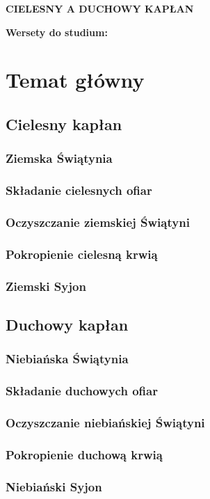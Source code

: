 \documentclass[10pt,a4paper,oneside]{article}
\begin{document}
\centerline{\textbf{\MakeUppercase{Cielesny a duchowy kapłan}}}
\begin{center}
\textbf{Wersety do studium:} 

\end{center}
\section{Temat główny}
\subsection{Cielesny kapłan}
\subsubsection{Ziemska Świątynia}
\subsubsection{Składanie cielesnych ofiar}
\subsubsection{Oczyszczanie ziemskiej Świątyni}
\subsubsection{Pokropienie cielesną krwią}
\subsubsection{Ziemski Syjon}
\subsection{Duchowy kapłan}
\subsubsection{Niebiańska Świątynia}
\subsubsection{Składanie duchowych ofiar}
\subsubsection{Oczyszczanie niebiańskiej Świątyni}
\subsubsection{Pokropienie duchową krwią}
\subsubsection{Niebiański Syjon}
\end{document}
